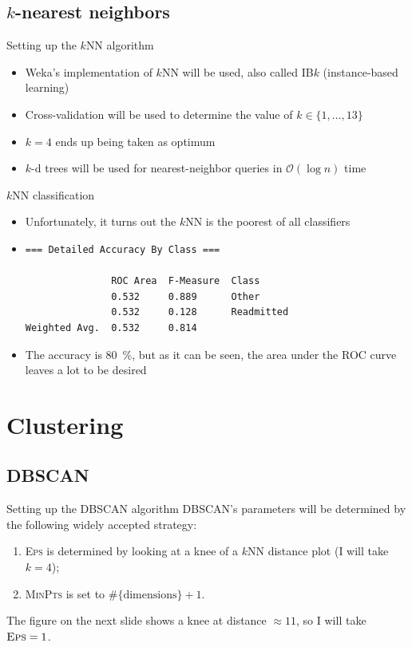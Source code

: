 \documentclass[serif, hyperref={unicode}, xcolor={x11names, psnames, dvipsnames,
  table}, usepdftitle=false]{beamer}
\begin{document}
\subsection{$k$-nearest neighbors}
\begin{frame}{Setting up the $k$NN algorithm}
  \begin{itemize}
  \item Weka's implementation of $k$NN will be used, also called IB$k$
    (instance-based learning)
  \item Cross-validation will be used to determine the value of $k \in \{1,
    \ldots, 13\}$
  \item $k = 4$ ends up being taken as optimum
  \item $k$-d trees will be used for nearest-neighbor queries in $\mathcal
    O(\log n)$ time
  \end{itemize}
\end{frame}

\begin{frame}[fragile]{$k$NN classification}
  \begin{itemize}
  \item Unfortunately, it turns out the $k$NN is the poorest of all classifiers
  \item
\begin{Verbatim}
=== Detailed Accuracy By Class ===

               ROC Area  F-Measure  Class
               0.532     0.889      Other
               0.532     0.128      Readmitted
Weighted Avg.  0.532     0.814
\end{Verbatim}
  \item The accuracy is \SI{80}{\percent}, but as it can be seen, the area under
    the ROC curve leaves a lot to be desired
  \end{itemize}
\end{frame}

\section{Clustering}

\subsection{DBSCAN}
\begin{frame}{Setting up the DBSCAN algorithm}
  DBSCAN's parameters will be determined by the following widely accepted
  strategy:
  \begin{enumerate}
  \item \textsc{Eps} is determined by looking at a knee of a $k$NN distance plot
    (I will take $k = 4$);
  \item \textsc{MinPts} is set to $\#\{\text{dimensions}\} + 1$.
  \end{enumerate}
  The figure on the next slide shows a knee at distance $\approx \num{11}$, so I
  will take $\textsc{Eps} = 1$.
\end{frame}
\end{document}
